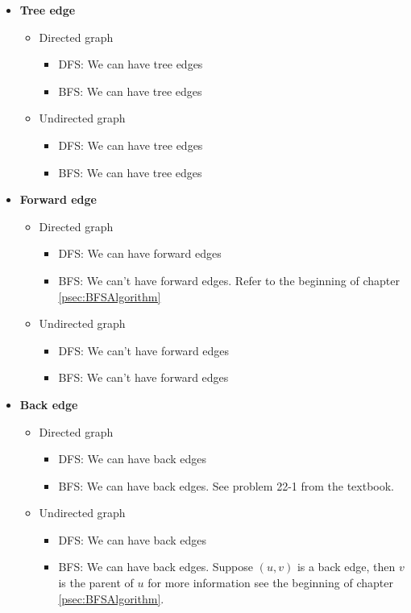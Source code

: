 \documentclass{book}
\begin{document}
	\begin{itemize}
		\item \textbf{Tree edge}
		\begin{itemize}
			\item Directed graph
			\begin{itemize}
				\item DFS: We can have tree edges
				\item BFS: We can have tree edges
			\end{itemize}
			\item Undirected graph
			\begin{itemize}
				\item DFS: We can have tree edges
				\item BFS: We can have tree edges
			\end{itemize}				
		\end{itemize}
		\item \textbf{Forward edge}
		\begin{itemize}
			\item Directed graph
			\begin{itemize}
				\item DFS: We can have forward edges
				\item BFS: We can't have forward edges. Refer to the beginning of chapter \ref{psec:BFSAlgorithm}
			\end{itemize}
			\item Undirected graph
			\begin{itemize}
				\item DFS: We can't have forward edges
				\item BFS: We can't have forward edges
			\end{itemize}				
		\end{itemize}
		\item \textbf{Back edge}
		\begin{itemize}
			\item Directed graph
			\begin{itemize}
				\item DFS: We can have back edges
				\item BFS: We can have back edges. See problem 22-1 from the textbook.
			\end{itemize}
			\item Undirected graph
			\begin{itemize}
				\item DFS: We can have back edges
				\item BFS: We can have back edges. Suppose $(u, v)$ is a back edge, then $v$ is the parent of $u$ for more information see the beginning of chapter \ref{psec:BFSAlgorithm}.

\end{itemize}
\end{itemize}
\end{itemize}
\end{document}
